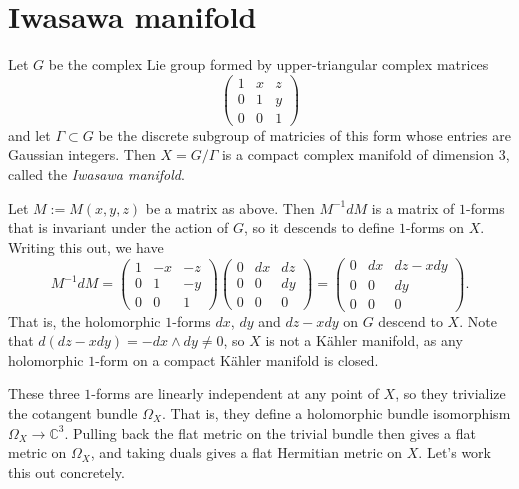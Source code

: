 \documentclass[11pt]{article}
\newcommand{\kk}[1]{\mathbb{#1}}
\begin{document}
\section{Iwasawa manifold}
\label{sec:orgd67c2ff}

Let $G$ be the complex Lie group formed by upper-triangular complex matrices
$$
\begin{pmatrix}
  1 & x & z
  \\
  0 & 1 & y
  \\
  0 & 0 & 1
\end{pmatrix}
$$
and let $\Gamma \subset G$ be the discrete subgroup of matricies of this form whose entries are Gaussian integers. Then $X = G / \Gamma$ is a compact complex manifold of dimension $3$, called the \emph{Iwasawa manifold}.

Let $M := M(x,y,z)$ be a matrix as above. Then $M^{-1}dM$ is a matrix of $1$-forms that is invariant under the action of $G$, so it descends to define $1$-forms on $X$. Writing this out, we have
$$
M^{-1}dM
= \begin{pmatrix}
  1 & -x & -z
  \\
  0 & 1 & -y
  \\
  0 & 0 & 1
\end{pmatrix}
\begin{pmatrix}
  0 & dx & dz
  \\
  0 & 0 & dy
  \\
  0 & 0 & 0
\end{pmatrix}
=
\begin{pmatrix}
  0 & dx & dz - x dy
  \\
  0 & 0 & dy
  \\
  0 & 0 & 0
\end{pmatrix}.
$$
That is, the holomorphic $1$-forms $dx$, $dy$ and $dz - x dy$ on $G$ descend to $X$. Note that $d(dz - xdy) = -dx \wedge dy \not= 0$, so $X$ is not a K\"ahler manifold, as any holomorphic $1$-form on a compact K\"ahler manifold is closed.

These three $1$-forms are linearly independent at any point of $X$, so they trivialize the cotangent bundle $\Omega_X$. That is, they define a holomorphic bundle isomorphism $\Omega_X \to \kk C^3$. Pulling back the flat metric on the trivial bundle then gives a flat metric on $\Omega_X$, and taking duals gives a flat Hermitian metric on $X$. Let's work this out concretely.
\end{document}
